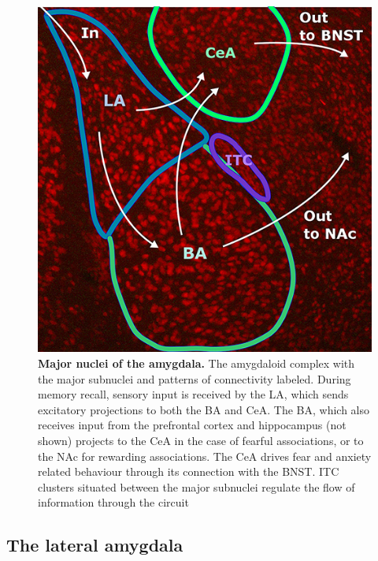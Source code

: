 \documentclass[12pt,a4paper,]{report}
\begin{document}
\begin{figure}[htbp]
\centering
\includegraphics{source/figures/amygdaloidcomplex.jpg}
\caption{\textbf{Major nuclei of the amygdala.} The amygdaloid complex
with the major subnuclei and patterns of connectivity labeled. During
memory recall, sensory input is received by the LA, which sends
excitatory projections to both the BA and CeA. The BA, which also
receives input from the prefrontal cortex and hippocampus (not shown)
projects to the CeA in the case of fearful associations, or to the NAc
for rewarding associations. The CeA drives fear and anxiety related
behaviour through its connection with the BNST. ITC clusters situated
between the major subnuclei regulate the flow of information through the
circuit \label{ref_a_figure}}
\end{figure}

\subsection{The lateral amygdala}\label{the-lateral-amygdala}
\end{document}
